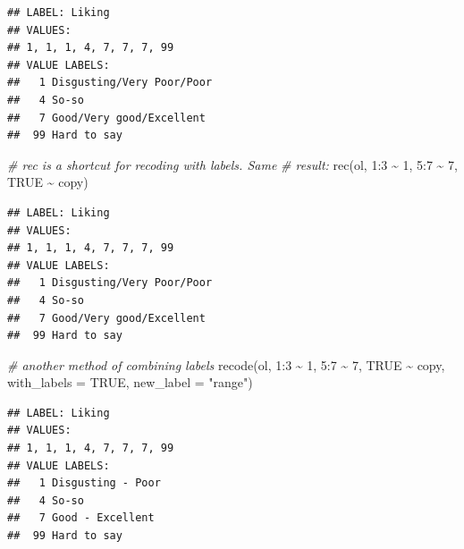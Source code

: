 \documentclass[
]{book}
\newenvironment{Shaded}{\begin{snugshade}}{\end{snugshade}}
\newcommand{\AttributeTok}[1]{\textcolor[rgb]{0.77,0.63,0.00}{#1}}
\newcommand{\CommentTok}[1]{\textcolor[rgb]{0.56,0.35,0.01}{\textit{#1}}}
\newcommand{\ConstantTok}[1]{\textcolor[rgb]{0.00,0.00,0.00}{#1}}
\newcommand{\DecValTok}[1]{\textcolor[rgb]{0.00,0.00,0.81}{#1}}
\newcommand{\FunctionTok}[1]{\textcolor[rgb]{0.00,0.00,0.00}{#1}}
\newcommand{\NormalTok}[1]{#1}
\newcommand{\SpecialCharTok}[1]{\textcolor[rgb]{0.00,0.00,0.00}{#1}}
\newcommand{\StringTok}[1]{\textcolor[rgb]{0.31,0.60,0.02}{#1}}
\begin{document}
\begin{verbatim}
## LABEL: Liking 
## VALUES:
## 1, 1, 1, 4, 7, 7, 7, 99
## VALUE LABELS:                             
##   1 Disgusting/Very Poor/Poor
##   4 So-so                    
##   7 Good/Very good/Excellent 
##  99 Hard to say
\end{verbatim}

\begin{Shaded}
\begin{Highlighting}[]
\CommentTok{\# \textquotesingle{}rec\textquotesingle{} is a shortcut for recoding with labels. Same}
\CommentTok{\# result:}
\FunctionTok{rec}\NormalTok{(ol, }\DecValTok{1}\SpecialCharTok{:}\DecValTok{3} \SpecialCharTok{\textasciitilde{}} \DecValTok{1}\NormalTok{, }\DecValTok{5}\SpecialCharTok{:}\DecValTok{7} \SpecialCharTok{\textasciitilde{}} \DecValTok{7}\NormalTok{, }\ConstantTok{TRUE} \SpecialCharTok{\textasciitilde{}}\NormalTok{ copy)}
\end{Highlighting}
\end{Shaded}

\begin{verbatim}
## LABEL: Liking 
## VALUES:
## 1, 1, 1, 4, 7, 7, 7, 99
## VALUE LABELS:                             
##   1 Disgusting/Very Poor/Poor
##   4 So-so                    
##   7 Good/Very good/Excellent 
##  99 Hard to say
\end{verbatim}

\begin{Shaded}
\begin{Highlighting}[]
\CommentTok{\# another method of combining labels}
\FunctionTok{recode}\NormalTok{(ol, }\DecValTok{1}\SpecialCharTok{:}\DecValTok{3} \SpecialCharTok{\textasciitilde{}} \DecValTok{1}\NormalTok{, }\DecValTok{5}\SpecialCharTok{:}\DecValTok{7} \SpecialCharTok{\textasciitilde{}} \DecValTok{7}\NormalTok{, }\ConstantTok{TRUE} \SpecialCharTok{\textasciitilde{}}\NormalTok{ copy, }\AttributeTok{with\_labels =} \ConstantTok{TRUE}\NormalTok{,}
  \AttributeTok{new\_label =} \StringTok{"range"}\NormalTok{)}
\end{Highlighting}
\end{Shaded}

\begin{verbatim}
## LABEL: Liking 
## VALUES:
## 1, 1, 1, 4, 7, 7, 7, 99
## VALUE LABELS:                     
##   1 Disgusting - Poor
##   4 So-so            
##   7 Good - Excellent 
##  99 Hard to say
\end{verbatim}
\end{document}
